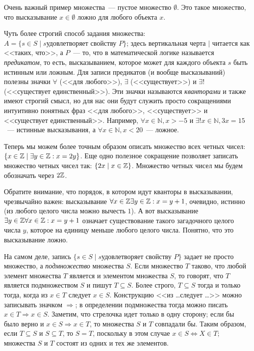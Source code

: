 Очень важный пример множества~--- пустое множество $\emptyset$. Это
такое множество, что высказывание $x\in\emptyset$ ложно для любого
объекта $x$.

Чуть более строгий способ задания множества: $A=\{s\in S\mid s\text{
  удовлетворяет свойству }P\}$; здесь вертикальная черта $\mid$
читается как <<таких, что>>, а $P$~--- то, что в математической
логике называется {\it предикатом}, то есть, высказыванием, которое
может для каждого объекта $s$ быть истинным или ложным. Для записи
предикатов (и вообще высказываний) полезны значки $\forall$ (<<для
любого>>), $\exists$ (<<существует>>) и $\exists!$ (<<существует
единственный>>). Эти значки называются {\it кванторами} и также имеют
строгий смысл, но для нас они будут служить просто сокращениями
интуитивно понятных фраз <<для любого>>, <<существует>> и <<существует
единственный>>. Например, $\forall x\in\mathbb N, x>-5$ и $\exists!
x\in\mathbb N, 3x=15$~--- истинные
высказывания, а $\forall x\in\mathbb N, x<20$~--- ложное.

Теперь мы можем более точным образом описать множество всех четных
чисел: $\{x\in\mathbb Z\mid \exists y\in\mathbb Z: x=2y\}$. Еще одно полезное
сокращение позволяет записать множество четных чисел так: $\{2x\mid
x\in\mathbb Z\}$. Множество четных чисел мы будем обозначать через $2\mathbb
Z$.

Обратите внимание, что порядок, в котором идут кванторы в
высказывании, чрезвычайно важен: высказывание $\forall x\in\mathbb Z\exists
y\in\mathbb Z:x=y+1$, очевидно, истинно (из любого целого числа можно
вычесть $1$). А вот высказывание $\exists y\in\mathbb Z\forall x\in\mathbb
Z:x=y+1$ означает существование такого загадочного целого числа $y$,
которое на единицу меньше любого целого числа. Понятно, что это
высказывание ложно.

На самом деле, запись  $\{s\in S\mid s\text{
  удовлетворяет свойству }P\}$ задает не просто множество, а
{\it подмножество} множества $S$. Если множество $T$ таково, что любой
элемент множества $T$ является и элементом множества $S$, то говорят,
что $T$ является подмножеством $S$ и пишут $T\subseteq S$. Более
строго, $T\subseteq S$ тогда и только тогда, когда из $x\in T$ следует
$x\in S$. Конструкцию <<из \dots следует \dots>> можно записывать
значком $\Rightarrow$; в определении подмножества тогда можно писать
$x\in T\Rightarrow x\in S$. Заметим, что стрелочка идет только в одну
сторону; если бы было верно и $x\in S\Rightarrow x\in T$, то множества
$S$ и $T$ совпадали бы. Таким образом, если $T\subseteq S$ и
$S\subseteq T$, то $S=T$, поскольку в этом случае $x\in
S\Leftrightarrow X\in T$; множества $S$ и $T$ состоят из
одних и тех же элементов.

